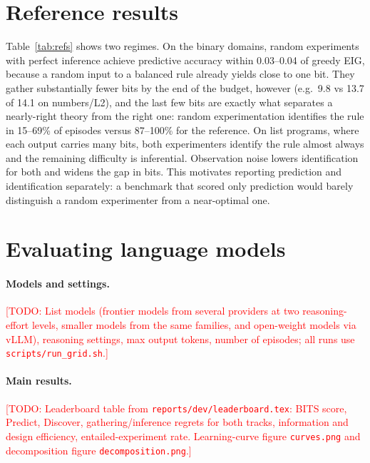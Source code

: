 \documentclass[11pt]{article}
\newcommand{\todo}[1]{\textcolor{red}{[TODO: #1]}}
\begin{document}
\section{Reference results}\label{sec:refs}

\begin{table}[t]
\centering
\small

\caption{Reference experimenters with exact Bayesian inference on the dev split (30 episodes per
configuration). Accuracy is the area under the learning curve over the four checkpoints; ``identified''
is the posterior mass of the MAP rule after the full budget $B$.}
\label{tab:refs}
\end{table}

Table~\ref{tab:refs} shows two regimes. On the binary domains, random experiments with perfect
inference achieve predictive accuracy within 0.03--0.04 of greedy EIG, because a random input to a
balanced rule already yields close to one bit. They gather substantially fewer bits by the end of the
budget, however (e.g.\ 9.8 vs 13.7 of 14.1 on numbers/L2), and the last few bits are exactly what
separates a nearly-right theory from the right one: random experimentation identifies the rule in
15--69\% of episodes versus 87--100\% for the reference. On list programs, where each output carries many
bits, both experimenters identify the rule almost always and the remaining difficulty is inferential.
Observation noise lowers identification for both and widens the gap in bits. This motivates reporting
prediction and identification separately: a benchmark that scored only prediction would barely
distinguish a random experimenter from a near-optimal one.

\section{Evaluating language models}\label{sec:llm}

\paragraph{Models and settings.} \todo{List models (frontier models from several providers at two
reasoning-effort levels, smaller models from the same families, and open-weight models via vLLM), reasoning
settings, max output tokens, number of episodes; all runs use \texttt{scripts/run\_grid.sh}.}

\paragraph{Main results.} \todo{Leaderboard table from \texttt{reports/dev/leaderboard.tex}: BITS score,
Predict, Discover, gathering/inference regrets for both tracks, information and design efficiency,
entailed-experiment rate. Learning-curve figure \texttt{curves.png} and decomposition figure
\texttt{decomposition.png}.}
\end{document}
